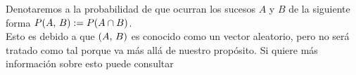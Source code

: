 \begin{Obs}
Denotaremos a la probabilidad de que ocurran los sucesos $A$ y $B$ de la siguiente forma $P(A,\thinspace B):=P(A\cap B)$.\\ Esto es debido a que $(A,\thinspace B)$ es conocido como un vector aleatorio, pero no será tratado como tal porque va más allá de nuestro propósito. Si quiere más información sobre esto puede consultar 
\end{Obs}
\begin{comment}
\begin{Def}
Se dice que un conjunto $A\subset\R$ tiene medida cero si, para cualquier $\epsilon>0$, existe una colección finita o infinita numerable de intervalos abiertos $\{I_n\}$ tal que $A\subset\bigcup I_n$ y $\sum_{n} I_n<\epsilon$
\end{Def}
La familia de conjuntos borelianos, si bien es bastante grande, presenta una limitación consistente en que un conjunto de medida cero puede no ser boreliano. En un problema de probabilidad, esto a su vez se traduce en que puede haber subconjuntos de conjuntos de probabilidad
cero para los cuales, por no ser borelianos, no está definida la función de probabilidad P, y por ende, tampoco $P_X$. Esto limitaría inlcusive a la función X del cual queremos extraer un valor numérico, pues debido a esto, podría existir algún $B\in B(\R)$ tal que $X^{-1}(B)$ tenga medida cero pero no sea boreleano. Esto sigificaría que X dejaría de ser un variable aleatoria.
Por esa razón, es conveniente considerar una $\sigma-$álgebra más grande que los borelianos, que incluya a todos los conjuntos de medida cero.
\begin{Def}
Diremos que un conjunto $A \subset\R $es
Lebesgue medible si pertenece a la $\sigma$-álgebra de subconjuntos de $\R$ generada por los borelianos y los conjuntos de medida cero.
$\mathscr{L}=\sigma(\{B: B\in B(\R) \textit{ o } B \textit{ B tiene medida cero}\})$
\end{Def}
\begin{Prop}
Todo conjunto Lebesgue medible se puede expresar como la unión de un conjunto boreliano y un conjunto de medida cero.
\end{Prop}
\begin{Def}
La medida de Lebesgue m en el intervalo, es la única medida de probabilidad definida sobre los subconjuntos Lebesgue medibles tal que $m(I)$ es igual a la longitud de I para cualquier intervalo
$I\subset\R$
\end{Def}
La unicidad se demuestra usado la definición de $\pi-$sistema y puede ser encontrado en cualquier libro de teoría de medida o en \cite{curso_medida_rotger}. Además la existencia de esta medida fue demostrada por Henri Léon Lebesgue en el año 1902.\\
Gracias a esto podemos considerar $\mathscr{F}=\mathscr{L}$ el espacio de probabilidad $(\Omega,\mathscr{L},m)$, $\Omega\subset\R$ pero por cuestiones de notación seguiremos usando $P=m$ como medida de probabilidad.
\end{comment}
